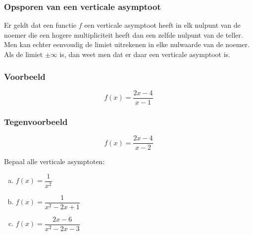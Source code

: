\documentclass[12pt]{article}
\begin{document}
\begin{theorie}
\subsubsection*{Opsporen van een verticale asymptoot}

Er geldt dat een functie $f$ een verticale asymptoot heeft in elk nulpunt van de noemer die een hogere multipliciteit heeft dan een zelfde nulpunt van de teller. Men kan echter eenvoudig de limiet uitrekenen in elke nulwaarde van de noemer. Als de limiet $\pm \infty$ is, dan weet men dat er daar een verticale asymptoot is.

\subsubsection*{Voorbeeld}
$$f(x)=\dfrac{2x-4}{x-1}$$

\subsubsection*{Tegenvoorbeeld}
$$f(x)=\dfrac{2x-4}{x-2}$$

\end{theorie}

\begin{oefening}
Bepaal alle verticale asymptoten:
\begin{enumerate}[(a)]
  \itemsep.5em
  \item $f(x)=\dfrac{1}{x^2}$
  \item $f(x)=\dfrac{1}{x^2-2x+1}$
  \item $f(x)=\dfrac{2x-6}{x^2-2x-3}$
\end{enumerate}
\end{oefening}
\end{document}

